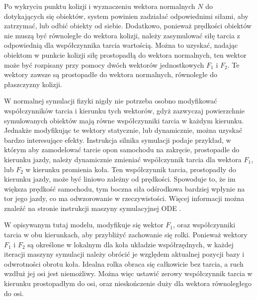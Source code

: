		Po wykryciu punktu kolizji i wyznaczeniu wektora normalnych $N$ do dotykających się obiektów, system powinien zadziałać odpowiednimi siłami, 
		aby zatrzymać, lub odbić obiekty od siebie.
		Dodatkowo, ponieważ prędkości obiektów nie muszą być równoległe do wektora kolizji, należy zasymulować siłę tarcia z odpowiednią dla współczynnika tarcia wartością.
		Można to uzyskać, nadając obiektom w punkcie kolizji siłę prostopadłą do wektora normalnych, 
		ten wektor może być rozpisany przy pomocy dwóch wektorów jednostkowych $F_1$ i $F_2$. 
		Te wektory zawsze są prostopadłe do wektora normalnych, równoległe do płaszczyzny kolizji.

		W normalnej symulacji fizyki nigdy nie potrzeba osobno modyfikować współczynników tarcia i kierunku tych wektorów, 
		gdyż zazwyczaj powierzchnie symulowanych obiektów mają równe współczynniki tarcia w każdym kierunku.
		Jednakże modyfikując te wektory statycznie, lub dynamicznie, można uzyskać bardzo interesujące efekty.
		Instrukcja silnika symulacji podaje przykład, w którym aby zamodelować tarcie opon samochodu na zakręcie, prostopadle do kierunku jazdy, 
		należy dynamicznie zmieniać współczynnik tarcia dla wektora $F_1$, lub $F_2$ w kierunku promienia koła.
		Ten współczynnik tarcia, prostopadły do kierunku jazdy, może być liniowo zależny od prędkości.
		Spowoduje to, że im większa prędkość samochodu, tym boczna siła odśrodkowa bardziej wpłynie na tor jego jazdy, co ma odwzorowanie w rzeczywistości.
		Więcej informacji można znaleźć na stronie instrukcji maszyny symulacyjnej ODE \cite{ode_contact}.

		W opisywanym tutaj modelu, modyfikuje się wektor $F_1$, oraz współczynniki tarcia w obu kierunkach, aby przybliżyć zachowanie się rolki.
		Ponieważ wektory $F_1$ i $F_2$ są określone w lokalnym dla koła układzie współrzędnych, 
		w każdej iteracji maszyny symulacji należy obrócić je względem aktualnej pozycji bazy i odwrotności obrotu koła.
		Idealna rolka obraca się całkowicie bez tarcia, a ruch wzdłuż jej osi jest niemożliwy.
		Można więc ustawić zerowy współczynnik tarcia w kierunku prostopadłym do osi, oraz nieskończenie duży dla wektora równoległego do osi.

